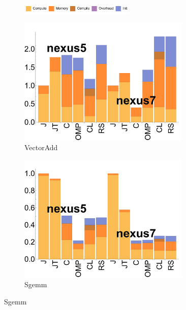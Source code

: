 \begin{figure}
  \centering

  \begin{subfigure}[b]{0.5\textwidth}
          \centering
          \includegraphics[width=0.6\textwidth]{data/legend.pdf}
  \end{subfigure}

  \begin{subfigure}[b]{0.23\textwidth}
      \centering
      \includegraphics[width=0.9\textwidth]{data/bbattery_vectoradd.pdf}
      \caption{VectorAdd}
  \end{subfigure}%
  \begin{subfigure}[b]{0.23\textwidth}
      \centering
      \includegraphics[width=0.9\textwidth]{data/bbattery_sgemm.pdf}
      \caption{Sgemm}
  \end{subfigure}



\end{figure}

